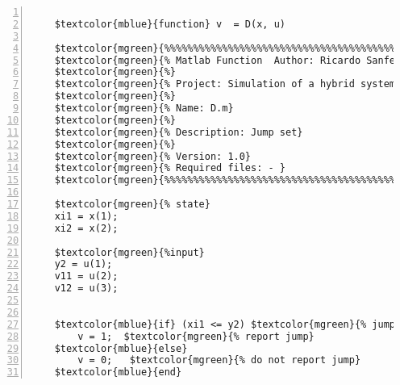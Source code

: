 %  
%  
%  
%  
  
  
\DefineShortVerb[fontfamily=courier,fontseries=m]{\$} 
\DefineShortVerb[fontfamily=courier,fontseries=b]{\#} 
  
\begin{Verbatim}[commandchars=\$\{\},numbers=left,numbersep=2pt] 

    $textcolor{mblue}{function} v  = D(x, u)  
     
    $textcolor{mgreen}{%%%%%%%%%%%%%%%%%%%%%%%%%%%%%%%%%%%%%%%%%%%%%%%%%%%%%%%%%%%%%%%%%%%%%%%%%%%} 
    $textcolor{mgreen}{% Matlab Function  Author: Ricardo Sanfelice} 
    $textcolor{mgreen}{%} 
    $textcolor{mgreen}{% Project: Simulation of a hybrid system (interconnection)} 
    $textcolor{mgreen}{%} 
    $textcolor{mgreen}{% Name: D.m} 
    $textcolor{mgreen}{%} 
    $textcolor{mgreen}{% Description: Jump set} 
    $textcolor{mgreen}{%} 
    $textcolor{mgreen}{% Version: 1.0} 
    $textcolor{mgreen}{% Required files: - } 
    $textcolor{mgreen}{%%%%%%%%%%%%%%%%%%%%%%%%%%%%%%%%%%%%%%%%%%%%%%%%%%%%%%%%%%%%%%%%%%%%%%%%%%%} 
     
    $textcolor{mgreen}{% state} 
    xi1 = x(1); 
    xi2 = x(2); 
     
    $textcolor{mgreen}{%input} 
    y2 = u(1); 
    v11 = u(2); 
    v12 = u(3); 
     
     
    $textcolor{mblue}{if} (xi1 <= y2) $textcolor{mgreen}{% jump condition} 
        v = 1;  $textcolor{mgreen}{% report jump} 
    $textcolor{mblue}{else} 
        v = 0;   $textcolor{mgreen}{% do not report jump} 
    $textcolor{mblue}{end}  
\end{Verbatim}  
  
\UndefineShortVerb{\$} 
\UndefineShortVerb{\#} 
 